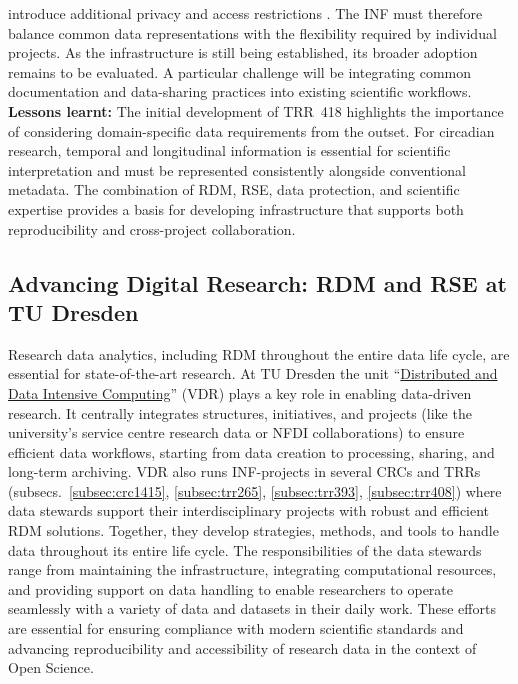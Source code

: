 \documentclass{eceasst}
\begin{document}
introduce additional privacy and access restrictions
\cite{baum_data_circadian_2023}.
The INF must therefore balance common data representations
with the flexibility required by individual projects.
As the infrastructure is still being established,
its broader adoption remains to be evaluated.
A particular challenge will be integrating common
documentation and data-sharing practices into existing
scientific workflows.
\\
\noindent\textbf{Lessons learnt:}
The initial development of TRR~418 highlights the
importance of considering domain-specific data
requirements from the outset. For circadian research,
temporal and longitudinal information is essential for scientific
interpretation and must be represented consistently
alongside conventional metadata.
The combination of RDM, RSE,
data protection, and scientific expertise provides
a basis for developing infrastructure that supports
both reproducibility and cross-project collaboration.

\subsection{Advancing Digital Research: RDM and RSE at TU Dresden}
\label{subsec:vdr}
Research data analytics, including RDM throughout the entire data life cycle, are essential for state-of-the-art research.
At TU Dresden the unit ``\href{https://tu-dresden.de/zih/forschung/datenintensives_rechnen}{Distributed and Data Intensive Computing}'' (VDR) plays a key role in enabling data-driven research.
It centrally integrates structures, initiatives, and projects (like the university’s service centre research data or NFDI collaborations)
to ensure efficient data workflows, starting from data creation to processing, sharing, and long-term archiving.
VDR also runs INF-projects in several CRCs and TRRs (subsecs.~\ref{subsec:crc1415}, \ref{subsec:trr265}, \ref{subsec:trr393}, \ref{subsec:trr408}) where data stewards support their interdisciplinary projects with robust and
efficient RDM solutions.
Together, they develop strategies, methods, and tools to handle data throughout its entire life cycle.
The responsibilities of the data stewards range from maintaining the infrastructure, integrating computational resources,
and providing support on data handling to enable researchers to operate seamlessly with a variety of data and datasets in their daily work.
These efforts are essential for ensuring compliance with modern scientific standards and advancing reproducibility and accessibility
of research data in the context of Open Science.
\end{document}
